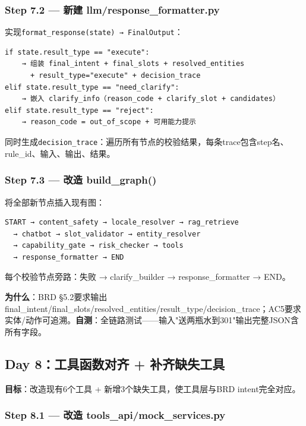 \documentclass[12pt,a4paper]{ctexart}
\begin{document}
\subsubsection*{Step 7.2 — 新建 llm/response\_formatter.py}

实现\texttt{format\_response(state) → FinalOutput}：

\begin{verbatim}
if state.result_type == "execute":
    → 组装 final_intent + final_slots + resolved_entities
      + result_type="execute" + decision_trace
elif state.result_type == "need_clarify":
    → 嵌入 clarify_info（reason_code + clarify_slot + candidates）
elif state.result_type == "reject":
    → reason_code = out_of_scope + 可用能力提示
\end{verbatim}

同时生成\texttt{decision\_trace}：遍历所有节点的校验结果，每条trace包含step名、rule\_id、输入、输出、结果。

\subsubsection*{Step 7.3 — 改造 build\_graph()}

将全部新节点插入现有图：

\begin{verbatim}
START → content_safety → locale_resolver → rag_retrieve
  → chatbot → slot_validator → entity_resolver
  → capability_gate → risk_checker → tools
  → response_formatter → END
\end{verbatim}

每个校验节点旁路：失败 → clarify\_builder → response\_formatter → END。

\textbf{为什么}：BRD §5.2要求输出final\_intent/final\_slots/resolved\_entities/result\_type/decision\_trace；AC5要求实体/动作可追溯。\textbf{自测}：全链路测试——输入"送两瓶水到301"输出完整JSON含所有字段。

\subsection{Day 8：工具函数对齐 + 补齐缺失工具}

\textbf{目标}：改造现有6个工具 + 新增3个缺失工具，使工具层与BRD intent完全对应。

\subsubsection*{Step 8.1 — 改造 tools\_api/mock\_services.py}
\end{document}

